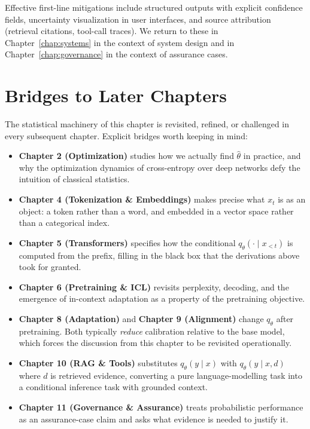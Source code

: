 Effective first-line mitigations include structured outputs with explicit confidence fields, uncertainty visualization in user interfaces, and source attribution (retrieval citations, tool-call traces). We return to these in Chapter~\ref{chap:systems} in the context of system design and in Chapter~\ref{chap:governance} in the context of assurance cases.

\section{Bridges to Later Chapters}

The statistical machinery of this chapter is revisited, refined, or challenged in every subsequent chapter. Explicit bridges worth keeping in mind:
\begin{itemize}
  \item \textbf{Chapter 2 (Optimization)} studies how we actually find $\hat\theta$ in practice, and why the optimization dynamics of cross-entropy over deep networks defy the intuition of classical statistics.
  \item \textbf{Chapter 4 (Tokenization \& Embeddings)} makes precise what $x_t$ is as an object: a token rather than a word, and embedded in a vector space rather than a categorical index.
  \item \textbf{Chapter 5 (Transformers)} specifies how the conditional $q_\theta(\cdot \mid x_{<t})$ is computed from the prefix, filling in the black box that the derivations above took for granted.
  \item \textbf{Chapter 6 (Pretraining \& ICL)} revisits perplexity, decoding, and the emergence of in-context adaptation as a property of the pretraining objective.
  \item \textbf{Chapter 8 (Adaptation)} and \textbf{Chapter 9 (Alignment)} change $q_\theta$ after pretraining. Both typically \emph{reduce} calibration relative to the base model, which forces the discussion from this chapter to be revisited operationally.
  \item \textbf{Chapter 10 (RAG \& Tools)} substitutes $q_\theta(y \mid x)$ with $q_\theta(y \mid x, d)$ where $d$ is retrieved evidence, converting a pure language-modelling task into a conditional inference task with grounded context.
  \item \textbf{Chapter 11 (Governance \& Assurance)} treats probabilistic performance as an assurance-case claim and asks what evidence is needed to justify it.
\end{itemize}

